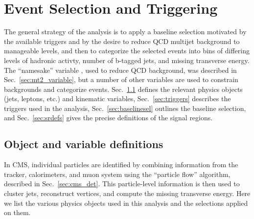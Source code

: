 \chapter{Event Selection and Triggering}

The general strategy of the \mttwo analysis is to apply a baseline selection
motivated by the available triggers and by the desire to reduce QCD multijet
background to manageable levels, and then to categorize the selected events
into bins of differing levels of hadronic activty, number of b-tagged jets, 
and missing transverse energy. The ``namesake'' variable \mttwo, used to reduce
QCD background, was described in Sec.~\ref{sec:mt2_variable}, but a number of other
variables are used to constrain backgrounds and categorize events.
Sec.~\ref{sec:objvardefs} defines the
relevant physics objects (jets, leptons, etc.) and kinematic variables, Sec.~\ref{sec:triggers} describes
the triggers used in the analysis, Sec.~\ref{sec:baselinesel} outlines the
baseline selection, and Sec.~\ref{sec:srdefs} gives the precise definitions
of the signal regions.

\section{Object and variable definitions}
\label{sec:objvardefs}

In CMS, individual particles are identified by combining information from the tracker, calorimeters, and muon system
using the ``particle flow'' algorithm, described in Sec.~\ref{sec:cms_det}. This particle-level information is
then used to cluster jets, reconstruct vertices, and compute the missing transverse energy. Here we list the various
physics objects used in this analysis and the selections applied on them.

